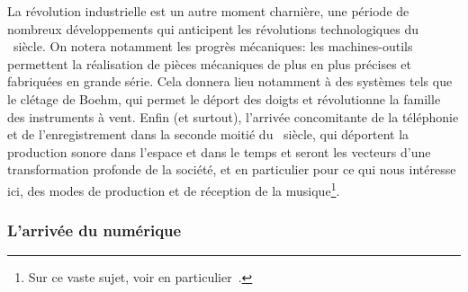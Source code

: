 \indent La révolution industrielle est un autre moment charnière, une période de nombreux développements qui anticipent les révolutions technologiques du ~siècle. On notera notamment les progrès mécaniques: les machines-outils permettent la réalisation de pièces mécaniques de plus en plus précises et fabriquées en grande série. Cela donnera lieu notamment à des systèmes tels que le clétage de Boehm, qui permet le déport des doigts et révolutionne la famille des instruments à vent. Enfin (et surtout), l'arrivée concomitante de la téléphonie et de l'enregistrement dans la seconde moitié du ~siècle, qui déportent la production sonore dans l'espace et dans le temps et seront les vecteurs d'une transformation profonde de la société, et en particulier pour ce qui nous intéresse ici, des modes de production et de réception de la musique\footnote{Sur ce vaste sujet, voir en particulier~\cite{theberge_any_1997}.}.


\subsubsection{L'arrivée du numérique}

